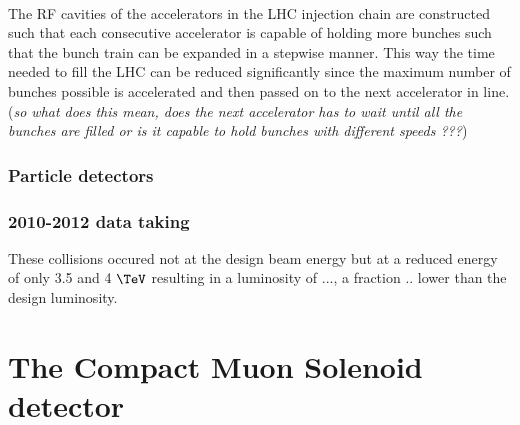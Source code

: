 \\
The RF cavities of the accelerators in the LHC injection chain are constructed such that each consecutive accelerator is capable of holding more bunches such that the bunch train can be expanded in a stepwise manner. This way the time needed to fill the LHC can be reduced significantly since the maximum number of bunches possible is accelerated and then passed on to the next accelerator in line. (\textit{so what does this mean, does the next accelerator has to wait until all the bunches are filled or is it capable to hold bunches with different speeds ???})






\subsubsection{Particle detectors}

\subsubsection{2010-2012 data taking}
These collisions occured not at the design beam energy but at a reduced energy of only 3.5 and 4 $\TeV$ resulting in a luminosity of ..., a fraction .. lower than the design luminosity.

\section{The Compact Muon Solenoid detector} 


